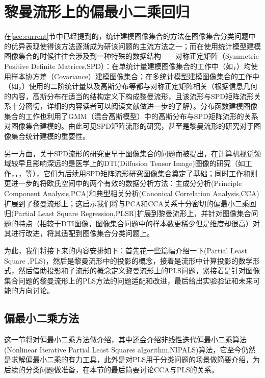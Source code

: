 \chapter{黎曼流形上的偏最小二乘回归}
\label{cha:rpls}
在\ref{sec:current}节中已经提到的，统计建模图像集合的方法在图像集合分类问题中的优异表现使得该方法逐渐成为研该问题的主流方法之一；而在使用统计模型建模图像集合的时候往往会涉及到一种特殊的数据结构——对称正定矩阵（Symmetric Positive Definite Matrices,SPD）：在单统计量建模图像集合的工作中（如\cite{Statistics_CDL}，\cite{Statistics_SPDML}）均使用样本协方差（Covariance）建模图像集合；在多统计模型建模图像集合的工作中（如\cite{Statistics_LMKML}，\cite{Statistics_HERML}）使用的二阶统计量以及高斯分布等都与对称正定矩阵相关（根据信息几何的内容\cite{Information_geometry}，高斯分布在适当的结构定义下构成黎曼流形，且该流形与SPD矩阵流形关系十分密切，详细的内容读者可以阅读文献\cite{Information_geometry}做进一步的了解）。分布函数建模图像集合的工作\cite{Statistics_DARG}也利用了GMM（混合高斯模型）中的高斯分布与SPD矩阵流形的关系对图像集合建模的。由此可见SPD矩阵流形的研究，甚至是黎曼流形的研究对于图像集合统计建模的重要性。

另一方面，关于SPD流形的研究更早于图像集合的问题而被提出，在计算机视觉领域较早且影响深远的是医学上的DTI(Diffusion Tensor Image)图像的研究（如工作\cite{AIM_metric}，\cite{LEM_metric}，\cite{PGA}，\cite{RCCA}等），它们为后续用SPD矩阵流形研究图像集合奠定了基础；同时工作\cite{PGA}和\cite{RCCA}则更进一步的将欧氏空间中的两个有效的数据分析方法：主成分分析(Principle Component Analysis,PCA)和典型相关分析(Canonical Correlation Analysis,CCA)扩展到了黎曼流形上；这启示我们将与PCA和CCA关系十分密切的偏最小二乘回归(Partial Least Square Regression,PLSR)扩展到黎曼流形上，并针对图像集合问题的特点（相较于DTI图像，图像集合问题中的样本数更稀少但是维度却很高）对其进行改进，将其适配到图像集合分类问题上。

为此，我们将接下来的内容安排如下：首先花一些篇幅介绍一下(Partial Least Square ,PLS)，然后是黎曼流形中的投影的概念，接着是流形中计算投影的数学形式，然后借助投影和子流形的概念定义黎曼流形上的PLS问题，紧接着是针对图像集合问题的黎曼流形上的PLS方法的问题适配和改进，最后给出实验验证和未来可能的方向讨论。

\section{偏最小二乘方法}
\label{sec:plsr}
这一节将对偏最小二乘方法做介绍，其中还会介绍非线性迭代偏最小二乘算法(Nonlinear Iterative Partial Least Squares algorithm,NIPALS)\cite{pls_NIPALS}算法，它至今仍然是求解偏最小二乘的有力工具，此外是对PLS用于分类问题的场景做简要介绍，为后续的分类问题做准备，在本节的最后简要讨论CCA与PLS的关系。

